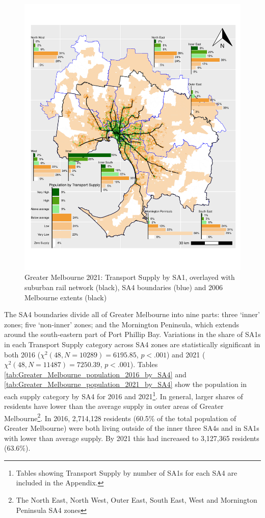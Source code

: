 \documentclass[preprint, 3p,
authoryear]{elsarticle} %
\begin{document}
\begin{figure}
\includegraphics[width=1\linewidth]{ReynoldsCurrieQu2024_files/figure-latex/Greater_Melbourne_population_2021_by_SA4-1} \caption{Greater Melbourne 2021: Transport Supply by SA1,  overlayed with suburban rail network (black), SA4 boundaries (blue) and 2006 Melbourne extents (black)}\label{fig:Greater_Melbourne_population_2021_by_SA4}
\end{figure}

The SA4 boundaries divide all of Greater Melbourne into nine parts:
three `inner' zones; five `non-inner' zones; and the Mornington
Peninsula, which extends around the south-eastern part of Port Phillip
Bay. Variations in the share of SA1s in each Transport Supply category
across SA4 zones are statistically significant in both 2016
(\(\chi^2(48, N = 10289) = 6195.85\), \(p < .001\)) and 2021
(\(\chi^2(48, N = 11487) = 7250.39\), \(p < .001\)). Tables
\ref{tab:Greater_Melbourne_population_2016_by_SA4} and
\ref{tab:Greater_Melbourne_population_2021_by_SA4} show the population
in each supply category by SA4 for 2016 and 2021\footnote{Tables showing
  Transport Supply by number of SA1s for each SA4 are included in the
  Appendix.}. In general, larger shares of residents have lower than the
average supply in outer areas of Greater Melbourne\footnote{The North
  East, North West, Outer East, South East, West and Mornington
  Peninsula SA4 zones}. In 2016, 2,714,128 residents (60.5\% of the
total population of Greater Melbourne) were both living outside of the
inner three SA4s and in SA1s with lower than average supply. By 2021
this had increased to 3,127,365 residents (63.6\%).
\end{document}
